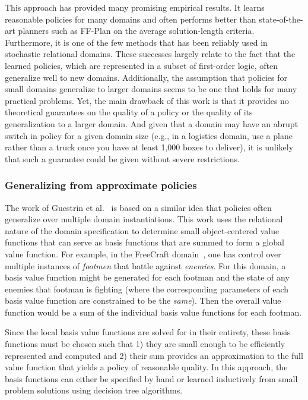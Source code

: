 This approach has provided many promising empirical results. It learns
reasonable policies for many domains and often performs better than
state-of-the-art planners such as FF-Plan on the average
solution-length criteria.  Furthermore, it is one of the few methods
that has been reliably used in stochastic relational domains.  These
successes largely relate to the fact that the learned policies, which
are represented in a subset of first-order logic, often generalize
well to new domains.  Additionally, the assumption that policies for
small domains generalize to larger domains seems to be one that holds
for many practical problems.  Yet, the main drawback of this work is
that it provides no theoretical guarantees on the quality of a policy
or the quality of its generalization to a larger domain.  And given
that a domain may have an abrupt switch in policy for a given domain
size (e.g., in a logistics domain, use a plane rather than a truck
once you have at least 1,000 boxes to deliver), it is unlikely that
such a guarantee could be given without severe restrictions.

\subsubsection{Generalizing from approximate policies}

The work of Guestrin et al.~\cite{freecraft} is based on a similar
idea that policies often generalize over multiple domain
instantiations.  This work uses the relational nature of the domain
specification to determine small object-centered value functions that
can serve as basis functions that are summed to form a global value
function.  For example, in the FreeCraft domain~\cite{freecraft}, one
has control over multiple instances of \emph{footmen} that battle
against \emph{enemies}.  For this domain, a basis value function might
be generated for each footman and the state of any enemies that
footman is fighting (where the corresponding parameters of each basis
value function are constrained to be the \emph{same}).  Then the overall
value function would be a sum of the individual basis value functions
for each footman.

Since the local basis value functions are solved for in their
entirety, these basis functions must be chosen such that 1) they are
small enough to be efficiently represented and computed and 2) their sum
provides an approximation to the full value function that
yields a policy of reasonable quality.  In this approach, the basis functions can
either be specified by hand or learned inductively from small problem
solutions using decision tree algorithms.

